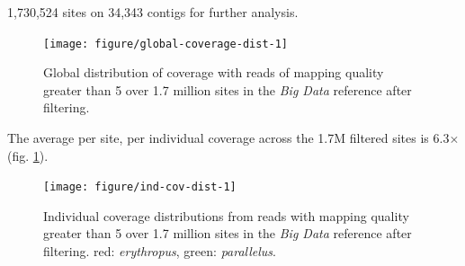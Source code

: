 \documentclass[a4paper,12pt,times,print,index,custombib,custommargin]{PhDThesisPSnPDF}\usepackage[]{graphicx}\usepackage[]{color}
\newenvironment{knitrout}{}{} %
\begin{document}
1,730,524 sites on 34,343 contigs for further analysis.
%
\begin{figure}[htb]
\centering
\begin{knitrout}
\color{fgcolor}

{\centering \texttt{[image: figure/global-coverage-dist-1]} 

}



\end{knitrout}
\caption{Global distribution of coverage with reads of mapping quality greater than 5 over 1.7 million sites in the \emph{Big Data} reference after filtering.}
\label{Fig:global-coverage-dist}
\end{figure}
%
The average per site, per individual coverage across the 1.7M filtered sites is 6.3$\times$ (fig. \ref{Fig:global-coverage-dist}).
%
\begin{figure}[htb]
\centering
\begin{knitrout}
\color{fgcolor}

{\centering \texttt{[image: figure/ind-cov-dist-1]} 

}



\end{knitrout}
\caption{Individual coverage distributions from reads with mapping quality greater than 5 over 1.7 million sites in the \emph{Big Data} reference after filtering. red: \textit{erythropus}, green: \textit{parallelus}.}
\label{Fig:individual-coverage-dist}
\end{figure}
%

%
%
\end{document}

